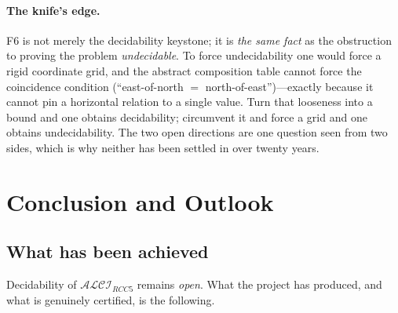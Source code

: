 \documentclass[
]{ceurart}
\theoremstyle{definition}
\newcommand{\ALCIRCC}[1]{\ensuremath{\mathcal{ALCI}_{\mathit{RCC#1}}}}
\begin{document}
\paragraph{The knife's edge.}
F6 is not merely the decidability keystone; it is \emph{the same fact} as
the obstruction to proving the problem \emph{undecidable}.  To force
undecidability one would force a rigid coordinate grid, and the abstract
composition table cannot force the coincidence condition
(``east-of-north $=$ north-of-east'')---exactly because it cannot pin a
horizontal relation to a single value.  Turn that looseness into a bound
and one obtains decidability; circumvent it and force a grid and one
obtains undecidability.  The two open directions are one question seen
from two sides, which is why neither has been settled in over twenty
years.

\section{Conclusion and Outlook}
\label{sec:outlook}

\subsection{What has been achieved}
\label{ssec:achieved}

Decidability of $\ALCIRCC{5}$ remains \emph{open}.  What the project has
produced, and what is genuinely certified, is the following.
\end{document}
